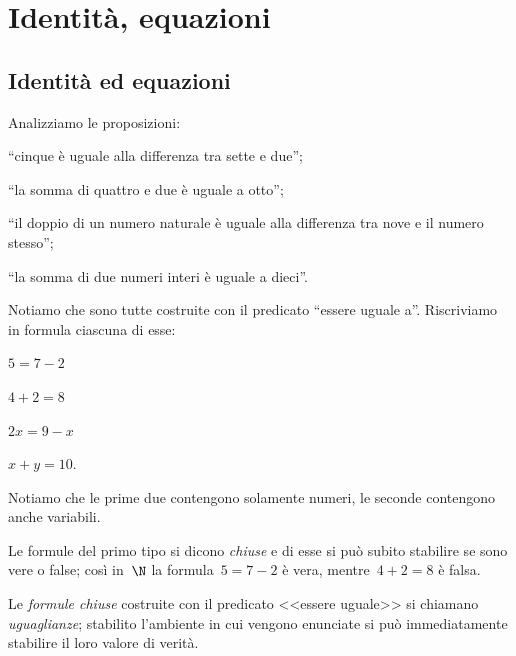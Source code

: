 


\chapter{Identità, equazioni}

\section{Identità ed equazioni}
\label{sec:13_definizioni}

Analizziamo le proposizioni:

\begin{enumeratea}
\item ``cinque è uguale alla differenza tra sette e due'';
\item ``la somma di quattro e due è uguale a otto'';
\item ``il doppio di un numero naturale è uguale alla differenza tra nove e il 
numero stesso'';
\item ``la somma di due numeri interi è uguale a dieci''.
\end{enumeratea}

Notiamo che sono tutte costruite con il predicato
``essere uguale a''. Riscriviamo in formula ciascuna di esse:
\begin{htmulticols}{4}
 \begin{enumeratea}
\item \(5=7-2\)
\item \(4+2=8\)
\item \(2x=9-x\)
\item \(x+y=10\).
\end{enumeratea}
\end{htmulticols}
Notiamo che le prime due contengono solamente numeri, le seconde
contengono anche variabili.

Le formule del primo tipo si dicono \emph{chiuse} e
di esse si può subito stabilire se sono vere o false; così in~\(\N\) la
formula~\(5 = 7 - 2\) è vera, mentre~\(4 + 2 = 8\) è falsa.

\begin{definizione}{}{}
 Le \emph{formule chiuse} costruite con il predicato
<<essere uguale>> si chiamano \emph{uguaglianze};
stabilito l'ambiente in cui vengono enunciate si può
immediatamente stabilire il loro valore di verità.
\end{definizione}


